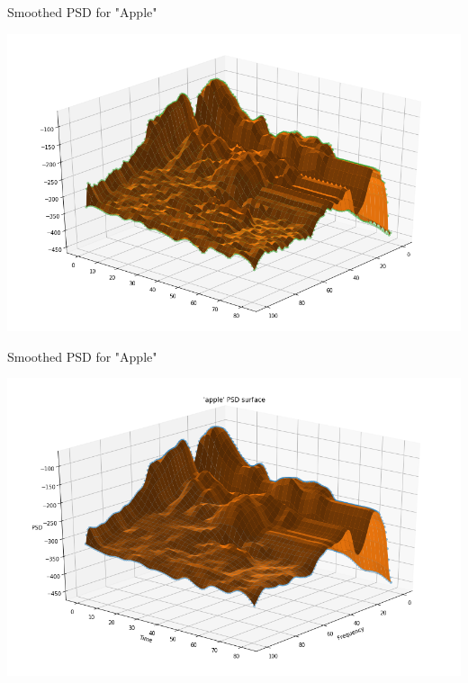 \documentclass[14pt,aspectratio=169, serif, dvipsnames]{beamer}
\begin{document}
\begin{frame}{Smoothed PSD for "Apple"}
    \begin{center}
        \includegraphics[scale= 0.4]{pictures/apple.png}
    \end{center}
\end{frame}

\begin{frame}{Smoothed PSD for "Apple"}
    \begin{center}
        \includegraphics[scale= 0.4]{pictures/smoother_apple.png}
    \end{center}
\end{frame}
\end{document}
